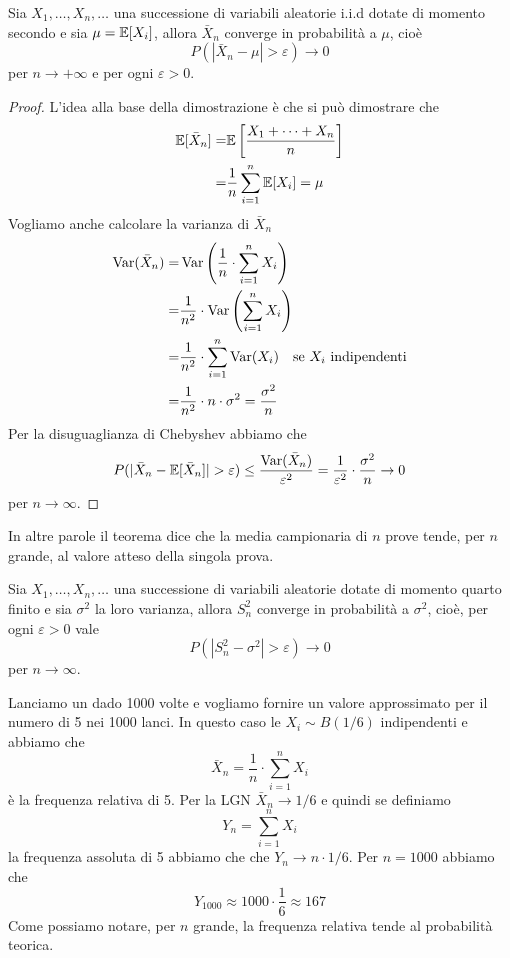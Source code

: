 \begin{theorem}\label{th: lgn}
	Sia $X_1, \dots, X_n, \dots$ una successione di variabili aleatorie i.i.d dotate di momento
	secondo e sia $\mu = \mathbb{E}[X_i]$, allora $\bar{X}_n$ converge in probabilità a $\mu$, cioè
	\[ P(|\bar{X}_n - \mu| > \varepsilon) \to 0 \]
	per $n \to +\infty$ e per ogni $\varepsilon > 0$.
	\begin{proof}
		L'idea alla base della dimostrazione è che si può dimostrare che
		\begin{align*}
			\mathbb{E}[\bar{X}_n] = & \mathbb{E}\left[ \frac{X_1 + \dots + X_n}{n} \right] \\
			=               & \frac{1}{n} \sum_{i=1}^n \mathbb{E}[X_i] = \mu
		\end{align*}
		Vogliamo anche calcolare la varianza di $\bar{X}_n$
		\begin{align*}
			\operatorname{Var}(\bar{X}_n) = & \operatorname{Var} \left( \frac{1}{n} \cdot \sum_{i=1}^n X_i \right)    \\
			=                 & \frac{1}{n^2} \cdot \operatorname{Var} \left( \sum_{i=1}^n X_i \right)  \\
			=                 & \frac{1}{n^2} \cdot \sum_{i=1}^n \operatorname{Var}(X_i)
			\quad \text{se $X_i$ indipendenti}                                            \\
			=                 & \frac{1}{n^2} \cdot n \cdot \sigma^2 = \frac{\sigma^2}{n}
		\end{align*}
		Per la disuguaglianza di Chebyshev abbiamo che
		\[
			P(|\bar{X}_n - \mathbb{E}[\bar{X}_n]| >
			\varepsilon) \leq \frac{\operatorname{Var}(\bar{X}_n)}{\varepsilon^2} =
			\frac{1}{\varepsilon^2} \cdot \frac{\sigma^2}{n} \to 0
		\]
		per $n \to \infty$.
	\end{proof}
\end{theorem}

In altre parole il teorema dice che la media campionaria di $n$ prove tende, per $n$ grande, al
valore atteso della singola prova.

\begin{corollary}\label{cor: lgn}
	Sia $X_1, \dots, X_n, \dots$ una successione di variabili aleatorie dotate di momento quarto
	finito e sia $\sigma^2$ la loro varianza, allora $S_n^2$ converge in probabilità a $\sigma^2$,
	cioè, per ogni $\varepsilon > 0$ vale
	\[ P(|S_n^2 - \sigma^2| > \varepsilon) \to 0 \]
	per $n \to \infty$.
\end{corollary}

\begin{example}
	Lanciamo un dado 1000 volte e vogliamo fornire un valore approssimato per il numero di 5 nei
	1000 lanci. In questo caso le $X_i \sim B(1/6)$ indipendenti e abbiamo che
	\[ \bar{X}_n = \frac{1}{n} \cdot \sum_{i=1}^{n} X_i \]
	è la frequenza relativa di 5. Per la LGN $\bar{X}_n \to 1/6$ e quindi se definiamo
	\[ Y_n = \sum_{i=1}^{n} X_i \]
	la frequenza assoluta di 5 abbiamo che che $Y_n \to n \cdot 1/6$. Per $n=1000$ abbiamo che
	\[ Y_{1000} \approx 1000 \cdot \frac{1}{6} \approx 167 \]
	Come possiamo notare, per $n$ grande, la frequenza relativa tende al probabilità teorica.
\end{example}

